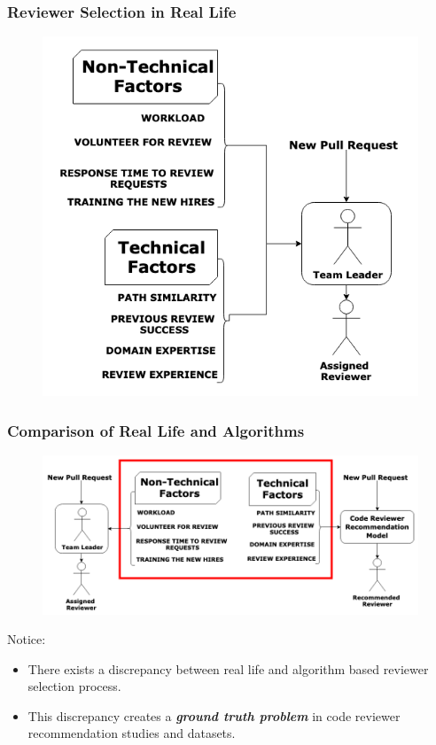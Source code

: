 \documentclass{beamer}
\begin{document}
\begin{frame}
\frametitle{\large Reviewer Selection in Real Life }

  \begin{figure}
    \includegraphics[height=0.9\textheight]{img/real-life.png}
    \end{figure}

\end{frame}

\begin{frame}
\frametitle{\large Comparison of Real Life and Algorithms}

  \begin{figure}
    \includegraphics[scale=0.31]{img/final-.png}
    \end{figure}
    \begin{alertblock}{Notice:}
        \begin{itemize}
        \item There exists a discrepancy between real life and algorithm based reviewer selection process.
        \item This discrepancy creates a \textbf{\textit{ground truth problem}} in code reviewer recommendation studies and datasets.
        \end{itemize}
    \end{alertblock}
\end{frame}
\end{document}
